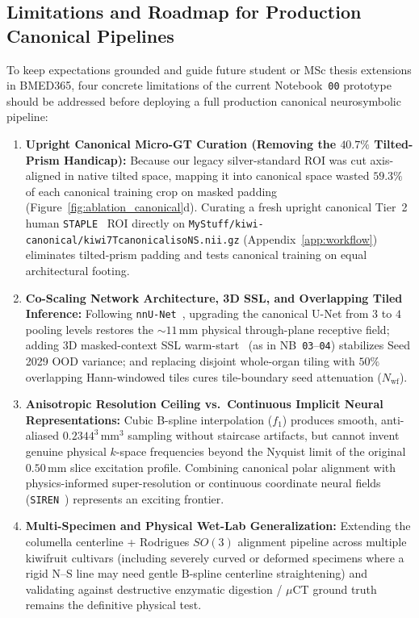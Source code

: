 \documentclass[10pt,a4paper]{article}
\renewcommand{\_}{\origunderscore\allowbreak}
\begin{document}
\subsection{Limitations and Roadmap for Production Canonical Pipelines}
\label{sec:disc_limits}

To keep expectations grounded and guide future student or MSc thesis extensions in BMED365, four concrete limitations of the current Notebook~\texttt{00} prototype should be addressed before deploying a full production canonical neurosymbolic pipeline:
\begin{enumerate}
    \item \textbf{Upright Canonical Micro-GT Curation (Removing the $40.7\%$ Tilted-Prism Handicap):} Because our legacy silver-standard ROI was cut axis-aligned in native tilted space, mapping it into canonical space wasted $59.3\%$ of each canonical training crop on masked padding (Figure~\ref{fig:ablation_canonical}d). Curating a fresh upright canonical Tier~2 human \texttt{STAPLE}~\cite{warfield2004staple} ROI directly on \texttt{MyStuff/kiwi-canonical/kiwi\_7T\_canonical\_iso\_NS.nii.gz} (Appendix~\ref{app:workflow}) eliminates tilted-prism padding and tests canonical training on equal architectural footing.
    \item \textbf{Co-Scaling Network Architecture, 3D SSL, and Overlapping Tiled Inference:} Following \texttt{nnU-Net}~\cite{isensee2021nnunet}, upgrading the canonical U-Net from $3$ to $4$ pooling levels restores the $\sim 11\,\text{mm}$ physical through-plane receptive field; adding 3D masked-context SSL warm-start~\cite{zhou2021modelsgenesis} (as in NB~\texttt{03}--\texttt{04}) stabilizes Seed 2029 OOD variance; and replacing disjoint whole-organ tiling with $50\%$ overlapping Hann-windowed tiles cures tile-boundary seed attenuation ($N_{\text{wf}}$).
    \item \textbf{Anisotropic Resolution Ceiling vs.\ Continuous Implicit Neural Representations:} Cubic B-spline interpolation ($f_1$) produces smooth, anti-aliased $0.2344^3\,\text{mm}^3$ sampling without staircase artifacts, but cannot invent genuine physical $k$-space frequencies beyond the Nyquist limit of the original $0.50\,\text{mm}$ slice excitation profile. Combining canonical polar alignment with physics-informed super-resolution or continuous coordinate neural fields (\texttt{SIREN}~\cite{sitzmann2020siren}) represents an exciting frontier.
    \item \textbf{Multi-Specimen and Physical Wet-Lab Generalization:} Extending the columella centerline + Rodrigues $SO(3)$ alignment pipeline across multiple kiwifruit cultivars (including severely curved or deformed specimens where a rigid N--S line may need gentle B-spline centerline straightening) and validating against destructive enzymatic digestion / $\mu$CT ground truth remains the definitive physical test.
\end{enumerate}
\end{document}
